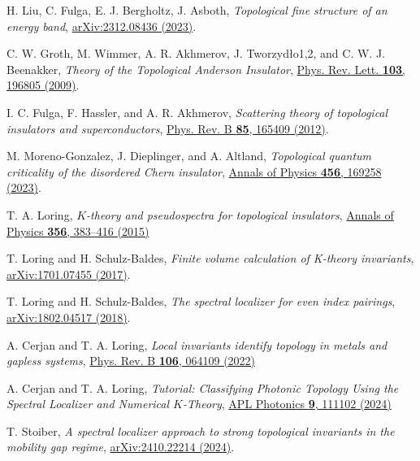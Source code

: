 \documentclass[aps,prl,amsmath,amssymb,twocolumn]{revtex4-2}
\begin{document}
\begin{thebibliography}{10}
H. Liu, C. Fulga, E. J. Bergholtz, J. Asboth, {\em Topological fine structure of an energy band}, \href{https://arxiv.org/abs/2312.08436}{arXiv:2312.08436 (2023)}.

C. W. Groth, M. Wimmer, A. R. Akhmerov, J. Tworzydło1,2, and C. W. J. Beenakker, {\em Theory of the Topological Anderson Insulator}, \href{https://journals.aps.org/prl/abstract/10.1103/PhysRevLett.103.196805}{Phys. Rev. Lett. {\bfseries 103}, 196805 (2009)}.

I. C. Fulga, F. Hassler, and A. R. Akhmerov, {\em Scattering theory of topological insulators and superconductors}, \href{https://journals.aps.org/prb/abstract/10.1103/PhysRevB.85.165409}{Phys. Rev. B {\bfseries 85}, 165409 (2012)}.

M. Moreno-Gonzalez, J. Dieplinger, and A. Altland, {\em Topological quantum criticality of the disordered Chern insulator}, \href{https://www.sciencedirect.com/science/article/pii/S000349162300043X?}{Annals of Physics {\bfseries 456}, 169258 (2023)}.

T. A. Loring, {\em $K$-theory and pseudospectra for topological insulators}, \href{https://www.sciencedirect.com/science/article/abs/pii/S0003491615000901}{Annals of Physics {\bfseries 356}, 383–416 (2015)}

T. Loring and H. Schulz-Baldes, {\em Finite volume calculation of K-theory invariants}, \href{https://arxiv.org/abs/1701.07455}{arXiv:1701.07455 (2017)}.

T. Loring and H. Schulz-Baldes, {\em The spectral localizer for even index pairings}, \href{https://arxiv.org/abs/1802.04517}{arXiv:1802.04517 (2018)}.

A. Cerjan and T. A. Loring, {\em Local invariants identify topology in metals and gapless systems}, \href{https://journals.aps.org/prb/abstract/10.1103/PhysRevB.106.064109}{Phys. Rev. B {\bfseries 106}, 064109 (2022)}

A. Cerjan and T. A. Loring, {\em Tutorial: Classifying Photonic Topology Using the Spectral Localizer and Numerical $K$-Theory}, \href{https://pubs.aip.org/aip/app/article/9/11/111102/3322376/Classifying-photonic-topology-using-the-spectral}{APL Photonics {\bfseries 9}, 111102 (2024)}

T. Stoiber, {\em A spectral localizer approach to strong topological invariants in the mobility gap regime}, \href{https://arxiv.org/abs/2410.22214}{ arXiv:2410.22214 (2024)}.

\end{thebibliography}
\end{document}
